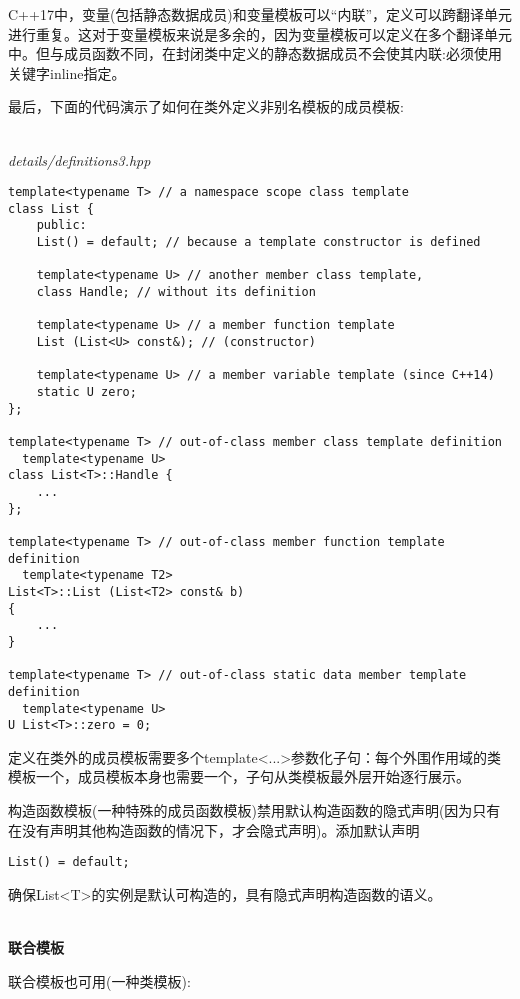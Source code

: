 C++17中，变量(包括静态数据成员)和变量模板可以“内联”，定义可以跨翻译单元进行重复。这对于变量模板来说是多余的，因为变量模板可以定义在多个翻译单元中。但与成员函数不同，在封闭类中定义的静态数据成员不会使其内联:必须使用关键字inline指定。

最后，下面的代码演示了如何在类外定义非别名模板的成员模板:

\hspace*{\fill} \\ %
\noindent
\textit{details/definitions3.hpp}
\begin{lstlisting}[style=styleCXX]
template<typename T> // a namespace scope class template
class List {
	public:
	List() = default; // because a template constructor is defined
	
	template<typename U> // another member class template,
	class Handle; // without its definition
	
	template<typename U> // a member function template
	List (List<U> const&); // (constructor)
	
	template<typename U> // a member variable template (since C++14)
	static U zero;
};

template<typename T> // out-of-class member class template definition
  template<typename U>
class List<T>::Handle {
	...
};

template<typename T> // out-of-class member function template definition
  template<typename T2>
List<T>::List (List<T2> const& b)
{
	...
}

template<typename T> // out-of-class static data member template definition
  template<typename U>
U List<T>::zero = 0;
\end{lstlisting}

定义在类外的成员模板需要多个template<...>参数化子句：每个外围作用域的类模板一个，成员模板本身也需要一个，子句从类模板最外层开始逐行展示。

构造函数模板(一种特殊的成员函数模板)禁用默认构造函数的隐式声明(因为只有在没有声明其他构造函数的情况下，才会隐式声明)。添加默认声明

\begin{lstlisting}[style=styleCXX]
List() = default;
\end{lstlisting}

确保List<T>的实例是默认可构造的，具有隐式声明构造函数的语义。

\hspace*{\fill} \\ %
\noindent
\textbf{联合模板}

联合模板也可用(一种类模板):

